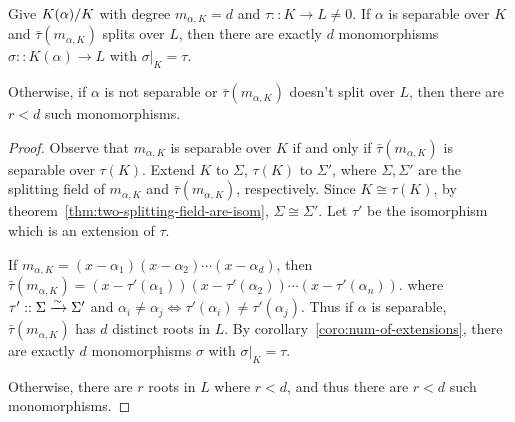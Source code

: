 \begin{prop} \label{prop:separable-and-split-have-most-embeddings}
  Give ${K(\alpha)}/{K}$ with degree $m_{\alpha, K} = d$ and $\tau :: K \to L \neq 0$.
  If $\alpha$ is separable over $K$ and $\bar\tau(m_{\alpha, K})$ splits over $L$, then
  there are exactly $d$ monomorphisms $\sigma :: K(\alpha) \to L$ with $\sigma\big|_K = \tau$.

  Otherwise, if $\alpha$ is not separable or $\bar\tau(m_{\alpha, K})$ doesn't split over $L$,
  then there are $r < d$ such monomorphisms.

  \begin{proof}
    Observe that $m_{\alpha, K}$ is separable over $K$ if and only if $\bar\tau(m_{\alpha, K})$
    is separable over $\tau(K)$.
    Extend $K$ to $\Sigma$, $\tau(K)$ to $\Sigma'$, where $\Sigma, \Sigma'$ are the splitting
    field of $m_{\alpha, K}$ and $\bar\tau(m_{\alpha, K})$, respectively.
    Since $K \cong \tau(K)$, by theorem~\ref{thm:two-splitting-field-are-isom}, $\Sigma \cong \Sigma'$.
    Let $\tau'$ be the isomorphism which is an extension of $\tau$.

    If $m_{\alpha, K} = (x - \alpha_1) (x - \alpha_2) \cdots (x - \alpha_d)$, then
    $\bar\tau(m_{\alpha, K}) = (x - \tau'(\alpha_1)) (x - \tau'(\alpha_2)) \cdots (x - \tau'(\alpha_n))$.
    where $\tau' :: \Sigma \xrightarrow{\sim} \Sigma'$ and $\alpha_i \neq \alpha_j \iff \tau'(\alpha_i) \neq \tau'(\alpha_j)$.
    Thus if $\alpha$ is separable, $\bar\tau(m_{\alpha, K})$ has $d$ distinct roots in $L$.
    By corollary~\ref{coro:num-of-extensions}, there are exactly $d$ monomorphisms
    $\sigma$ with $\sigma\big|_K = \tau$.

    Otherwise, there are $r$ roots in $L$ where $r < d$, and thus there are $r < d$ such monomorphisms.
  \end{proof}
\end{prop}


